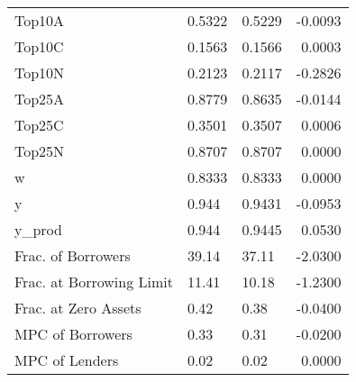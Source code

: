 \begin{table}
\begin{tabular}{lllr}
                  Top10A &  0.5322 &   0.5229 &  -0.0093 \\
                  Top10C &  0.1563 &   0.1566 &   0.0003 \\
                  Top10N &  0.2123 &   0.2117 &  -0.2826 \\
                  Top25A &  0.8779 &   0.8635 &  -0.0144 \\
                  Top25C &  0.3501 &   0.3507 &   0.0006 \\
                  Top25N &  0.8707 &   0.8707 &   0.0000 \\
                       w &  0.8333 &   0.8333 &   0.0000 \\
                       y &   0.944 &   0.9431 &  -0.0953 \\
                  y\_prod &   0.944 &   0.9445 &   0.0530 \\
      Frac. of Borrowers &   39.14 &    37.11 &  -2.0300 \\
Frac. at Borrowing Limit &   11.41 &    10.18 &  -1.2300 \\
    Frac. at Zero Assets &    0.42 &     0.38 &  -0.0400 \\
        MPC of Borrowers &    0.33 &     0.31 &  -0.0200 \\
          MPC of Lenders &    0.02 &     0.02 &   0.0000 \\
\bottomrule
\end{tabular}
\end{table}
